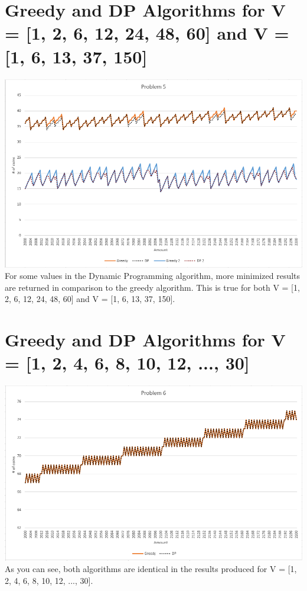 \documentclass[11pt,letterpaper]{article}
\begin{document}
\section{Greedy and DP Algorithms for V = [1, 2, 6, 12, 24, 48, 60] and V = [1, 6, 13, 37, 150]}
	\includegraphics[width=6in]{p5.png}\\
	For some values in the Dynamic Programming algorithm, more minimized results are returned in comparison to the greedy algorithm. This is true for both V = [1, 2, 6, 12, 24, 48, 60] and V = [1, 6, 13, 37, 150].\\
\section{Greedy and DP Algorithms for V = [1, 2, 4, 6, 8, 10, 12, ..., 30]}
	\includegraphics[width=5.5in]{p6.png}\\
	As you can see, both algorithms are identical in the results produced for V = [1, 2, 4, 6, 8, 10, 12, ..., 30].\\
\end{document}
